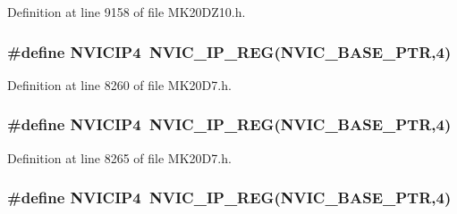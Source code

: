 Definition at line 9158 of file M\+K20\+D\+Z10.\+h.

\subsubsection[{\texorpdfstring{N\+V\+I\+C\+I\+P4}{NVICIP4}}]{\setlength{\rightskip}{0pt plus 5cm}\#define N\+V\+I\+C\+I\+P4~{\bf N\+V\+I\+C\+\_\+\+I\+P\+\_\+\+R\+EG}({\bf N\+V\+I\+C\+\_\+\+B\+A\+S\+E\+\_\+\+P\+TR},4)}\hypertarget{group___n_v_i_c___register___accessor___macros_gad7377cee124a395bdab11de8aabe7479}{}\label{group___n_v_i_c___register___accessor___macros_gad7377cee124a395bdab11de8aabe7479}


Definition at line 8260 of file M\+K20\+D7.\+h.

\subsubsection[{\texorpdfstring{N\+V\+I\+C\+I\+P4}{NVICIP4}}]{\setlength{\rightskip}{0pt plus 5cm}\#define N\+V\+I\+C\+I\+P4~{\bf N\+V\+I\+C\+\_\+\+I\+P\+\_\+\+R\+EG}({\bf N\+V\+I\+C\+\_\+\+B\+A\+S\+E\+\_\+\+P\+TR},4)}\hypertarget{group___n_v_i_c___register___accessor___macros_gad7377cee124a395bdab11de8aabe7479}{}\label{group___n_v_i_c___register___accessor___macros_gad7377cee124a395bdab11de8aabe7479}


Definition at line 8265 of file M\+K20\+D7.\+h.

\subsubsection[{\texorpdfstring{N\+V\+I\+C\+I\+P4}{NVICIP4}}]{\setlength{\rightskip}{0pt plus 5cm}\#define N\+V\+I\+C\+I\+P4~{\bf N\+V\+I\+C\+\_\+\+I\+P\+\_\+\+R\+EG}({\bf N\+V\+I\+C\+\_\+\+B\+A\+S\+E\+\_\+\+P\+TR},4)}\hypertarget{group___n_v_i_c___register___accessor___macros_gad7377cee124a395bdab11de8aabe7479}{}\label{group___n_v_i_c___register___accessor___macros_gad7377cee124a395bdab11de8aabe7479}


